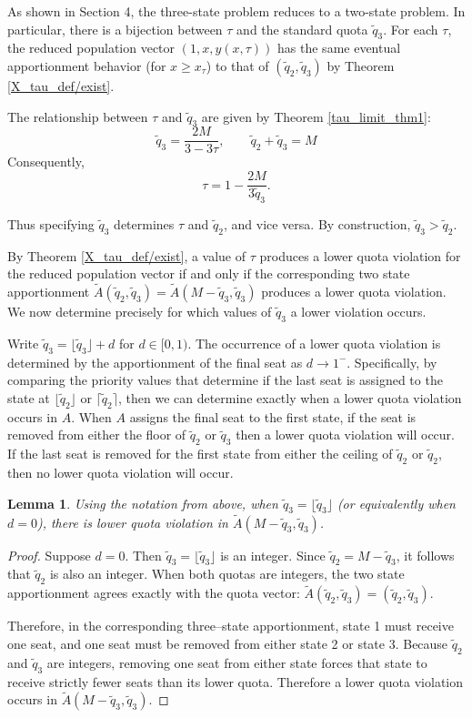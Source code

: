 \documentclass[11pt]{article}
\newtheorem{lemma}[theorem]{Lemma}
\theoremstyle{definition}
\theoremstyle{definition}
\begin{document}
As shown in Section 4, the three-state problem reduces to a two-state problem. In particular, there is a bijection between $\tau$ and the standard quota $\tilde{q}_3.$ For each $\tau$, the reduced population vector $(1,x,y(x,\tau))$ has the same eventual apportionment behavior (for $x \geq x_\tau$) to that of $(\tilde{q}_2,\tilde{q}_3)$ by Theorem \ref{X_tau_def/exist}. 

The relationship between $\tau$ and $\tilde{q}_3$ are given by Theorem \ref{tau_limit_thm1}: 
$$ \tilde{q}_3 = \frac{2M}{3-3\tau}, \qquad \tilde{q}_2 + \tilde{q}_3 = M$$
Consequently,
$$
\tau = 1 - \frac{2M}{3\tilde{q}_3}.
$$

Thus specifying $\tilde{q}_3$ determines $\tau$ and $\tilde{q}_2$, and vice versa. By construction, $\tilde{q}_3>\tilde{q}_2$.

By Theorem \ref{X_tau_def/exist}, a value of $\tau$ produces a lower quota violation for the reduced population vector if and only if the corresponding two state apportionment $\tilde{A}(\tilde{q}_2, \tilde{q}_3)=\tilde{A}(M-\tilde{q}_3, \tilde{q}_3)$ produces a lower quota violation. We now determine precisely for which values of $\tilde{q}_3$ a lower violation occurs. 

Write $\tilde{q}_3 = \lfloor \tilde{q}_3 \rfloor + d$ for $d \in [0,1)$. The occurrence of a lower quota violation is determined by the apportionment of the final seat as $d \to 1^-$. Specifically, by comparing the priority values that determine if the last seat is assigned to the state at $\lfloor \tilde{q}_2\rfloor$ or $\lceil \tilde{q}_2\rceil$, then we can determine exactly when a lower quota violation occurs in $A$. When $A$ assigns the final seat to the first state, if the seat is removed from either the floor of $\tilde{q}_2$ or $\tilde{q}_3$ then a lower quota violation will occur. If the last seat is removed for the first state from either the ceiling of $\tilde{q}_2$ or $\tilde{q}_2$, then no lower quota violation will occur. 

\begin{lemma}\label{d.initial=integers} Using the notation from above, when $\tilde{q}_3 = \lfloor \tilde{q}_3\rfloor$ (or equivalently when $d=0$), there is lower quota violation in $\tilde{A}(M-\tilde{q}_3, \tilde{q}_3)$. \end{lemma}

\begin{proof}
Suppose $d = 0$. Then $\tilde{q}_3 = \lfloor \tilde{q}_3 \rfloor$ is an integer. Since $\tilde{q}_2 = M - \tilde{q}_3$, it follows that $\tilde{q}_2$ is also an integer. When both quotas are integers, the two state apportionment agrees exactly with the quota vector: $\tilde{A}(\tilde{q}_2,\tilde{q}_3) = (\tilde{q}_2,\tilde{q}_3).$

Therefore, in the corresponding three–state apportionment, state 1 must receive one seat, and one seat must be removed from either state 2 or state 3. Because $\tilde{q}_2$ and $\tilde{q}_3$ are integers, removing one seat from either state forces that state to receive strictly fewer seats than its lower quota. Therefore a lower quota violation occurs in $\tilde{A}(M-\tilde{q}_3,\tilde{q}_3)$.
\end{proof} 
\end{document}
